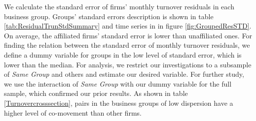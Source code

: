 We calculate the standard error of firms' monthly turnover residuals in each business group. Groups' standard errors description is shown in table \ref{tab:ResidualTrunStdSummary} and time series in in figure \ref{fig:GroupedResSTD}. On average, the affiliated firms' standard error is lower than unaffiliated ones. For finding the relation between the standard error of monthly turnover residuals, we define a dummy variable for groups in the low level of standard error, which is lower than the median. For analysis, we restrict our investigations to a subsample of \textit{Same Group} and others and estimate our desired variable.   For further study, we use the interaction of \textit{Same Group} with our dummy variable for the full sample, which confirmed our prior results. As shown in table \ref{Turnovercrosssection}, pairs in the business groups of low dispersion have a higher level of co-movement than other firms.


